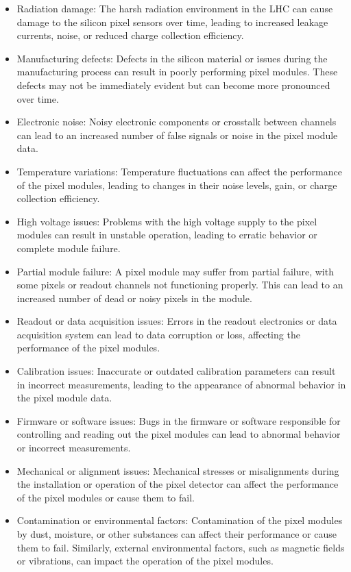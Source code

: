 \begin{itemize}

\item Radiation damage: The harsh radiation environment in the LHC can cause damage to the silicon pixel sensors over time, leading to increased leakage currents, noise, or reduced charge collection efficiency.

\item Manufacturing defects: Defects in the silicon material or issues during the manufacturing process can result in poorly performing pixel modules. These defects may not be immediately evident but can become more pronounced over time.

\item Electronic noise: Noisy electronic components or crosstalk between channels can lead to an increased number of false signals or noise in the pixel module data.

\item Temperature variations: Temperature fluctuations can affect the performance of the pixel modules, leading to changes in their noise levels, gain, or charge collection efficiency.

\item High voltage issues: Problems with the high voltage supply to the pixel modules can result in unstable operation, leading to erratic behavior or complete module failure.

\item Partial module failure: A pixel module may suffer from partial failure, with some pixels or readout channels not functioning properly. This can lead to an increased number of dead or noisy pixels in the module.

\item Readout or data acquisition issues: Errors in the readout electronics or data acquisition system can lead to data corruption or loss, affecting the performance of the pixel modules.

\item Calibration issues: Inaccurate or outdated calibration parameters can result in incorrect measurements, leading to the appearance of abnormal behavior in the pixel module data.

\item Firmware or software issues: Bugs in the firmware or software responsible for controlling and reading out the pixel modules can lead to abnormal behavior or incorrect measurements.

\item Mechanical or alignment issues: Mechanical stresses or misalignments during the installation or operation of the pixel detector can affect the performance of the pixel modules or cause them to fail.

\item Contamination or environmental factors: Contamination of the pixel modules by dust, moisture, or other substances can affect their performance or cause them to fail. Similarly, external environmental factors, such as magnetic fields or vibrations, can impact the operation of the pixel modules.

\end{itemize}

